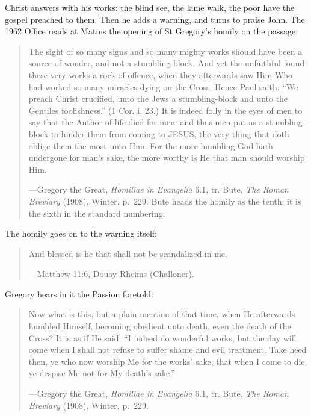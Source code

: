 \noindent Christ answers
with his works: the blind see, the lame walk, the poor have the gospel preached to them. Then he
adds a warning, and turns to praise John. The 1962 Office reads at Matins the opening of St
Gregory's homily on the passage:

\begin{quote}
The sight of so many signs and so many mighty works should have been a source of wonder, and not
a stumbling-block. And yet the unfaithful found these very works a rock of offence, when they
afterwards saw Him Who had worked so many miracles dying on the Cross. Hence Paul saith: ``We
preach Christ crucified, unto the Jews a stumbling-block and unto the Gentiles foolishness.'' (1
Cor. i. 23.) It is indeed folly in the eyes of men to say that the Author of life died for men:
and thus men put as a stumbling-block to hinder them from coming to JESUS, the very thing that
doth oblige them the most unto Him. For the more humbling God hath undergone for man's sake, the
more worthy is He that man should worship Him.\par
{\smallskip\noindent\small ---Gregory the Great, \textit{Homiliae in Evangelia} 6.1, tr. Bute,
\textit{The Roman Breviary} (1908), Winter, p.~229. Bute heads the homily as the tenth; it is
the sixth in the standard numbering.\par}
\end{quote}

The homily goes on to the warning itself:

\begin{quote}
And blessed is he that shall not be scandalized in me.\par
{\smallskip\noindent\small ---Matthew 11:6, Douay-Rheims (Challoner).\par}
\end{quote}

\noindent Gregory hears in it the Passion foretold:

\begin{quote}
Now what is this, but a plain mention of that time, when He afterwards humbled Himself, becoming
obedient unto death, even the death of the Cross? It is as if He said: ``I indeed do wonderful
works, but the day will come when I shall not refuse to suffer shame and evil treatment. Take
heed then, ye who now worship Me for the works' sake, that when I come to die ye despise Me not
for My death's sake.''\par
{\smallskip\noindent\small ---Gregory the Great, \textit{Homiliae in Evangelia} 6.1, tr. Bute,
\textit{The Roman Breviary} (1908), Winter, p.~229.\par}
\end{quote}

